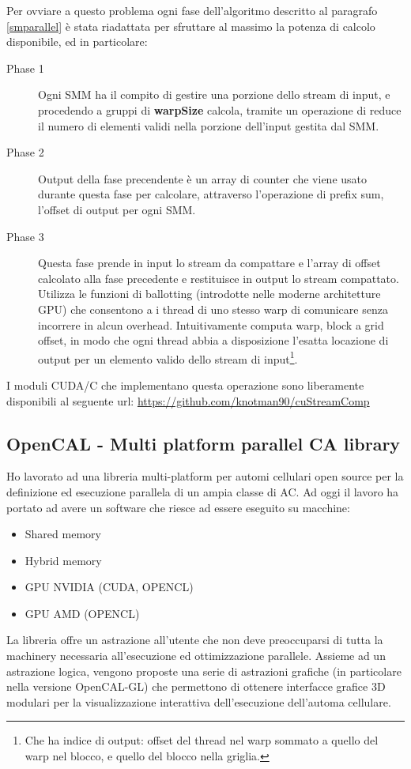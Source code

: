 \documentclass[a4paper]{article}
\begin{document}
  Per ovviare a questo problema ogni fase dell'algoritmo descritto al paragrafo
  \ref{smparallel} è stata riadattata per sfruttare al massimo la potenza di
  calcolo disponibile, ed in particolare:
  \begin{description}
  \item[Phase 1]
  	Ogni SMM ha il compito di gestire una porzione dello stream di input, e
  	procedendo a gruppi di \textbf{warpSize} calcola, tramite un operazione di
  	reduce il numero di elementi validi nella
  	porzione dell'input gestita dal SMM.
  \item[Phase 2]
  	Output della fase precendente è un array di counter che viene usato durante
  	questa fase per calcolare, attraverso l'operazione di prefix sum, l'offset
  	di output per ogni SMM.
  \item[Phase 3]
  	Questa fase prende in input lo stream da compattare e l'array di offset
  	calcolato alla fase precedente e restituisce in output lo stream compattato.
  	Utilizza le funzioni di ballotting (introdotte nelle moderne architetture
  	GPU) che consentono a i thread di uno stesso warp di comunicare senza
  	incorrere in alcun overhead. Intuitivamente computa warp, block a grid
  	offset, in modo che ogni thread abbia a disposizione l'esatta locazione di
  	output per un elemento valido dello stream di input\footnote{Che ha indice
  	di output: offset del thread nel warp sommato a quello del warp nel blocco,
  	e quello del blocco nella griglia.}.
  \end{description}
  I moduli CUDA/C che implementano questa operazione sono liberamente
  disponibili al seguente url: \url{https://github.com/knotman90/cuStreamComp}
  
  \subsection{OpenCAL - Multi platform parallel CA library}
  Ho lavorato ad una libreria multi-platform per automi cellulari open source
  per la definizione ed esecuzione parallela di un ampia classe di AC. Ad oggi
  il lavoro ha portato ad avere un software che riesce ad essere eseguito su
  macchine:
  \begin{itemize}
    \item Shared memory
    \item Hybrid memory
    \item GPU NVIDIA (CUDA, OPENCL)
    \item GPU AMD (OPENCL)
  \end{itemize}
  La libreria offre un astrazione all'utente che non deve preoccuparsi  di tutta la machinery
  necessaria all'esecuzione ed ottimizzazione parallele. Assieme ad un
  astrazione logica, vengono proposte una serie di astrazioni grafiche (in
  particolare nella versione OpenCAL-GL) che permettono di ottenere
  interfacce grafice 3D modulari per la visualizzazione interattiva
  dell'esecuzione dell'automa cellulare. 
  
\end{document}
